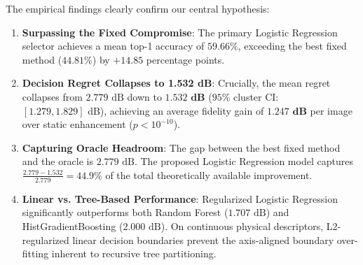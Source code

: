\documentclass[journal]{IEEEtran}
\begin{document}
\begin{table}[!t]
\centering
\caption{Primary Benchmark Results (5-Fold Grouped CV across 3 Random Seeds)}
\label{tab:primary_results}
\end{table}

The empirical findings clearly confirm our central hypothesis:
\begin{enumerate}
    \item \textbf{Surpassing the Fixed Compromise}: The primary Logistic Regression selector achieves a mean top-1 accuracy of $\mathbf{59.66\%}$, exceeding the best fixed method ($44.81\%$) by $\mathbf{+14.85}$ percentage points.
    \item \textbf{Decision Regret Collapses to 1.532 dB}: Crucially, the mean regret collapses from $2.779\text{ dB}$ down to $\mathbf{1.532\text{ dB}}$ ($95\%$ cluster CI: $[1.279, 1.829]\text{ dB}$), achieving an average fidelity gain of $\mathbf{1.247\text{ dB}}$ per image over static enhancement ($p < 10^{-10}$).
    \item \textbf{Capturing Oracle Headroom}: The gap between the best fixed method and the oracle is $2.779\text{ dB}$. The proposed Logistic Regression model captures $\frac{2.779 - 1.532}{2.779} = \mathbf{44.9\%}$ of the total theoretically available improvement.
    \item \textbf{Linear vs. Tree-Based Performance}: Regularized Logistic Regression significantly outperforms both Random Forest ($1.707\text{ dB}$) and HistGradientBoosting ($2.000\text{ dB}$). On continuous physical descriptors, L2-regularized linear decision boundaries prevent the axis-aligned boundary over-fitting inherent to recursive tree partitioning.
\end{enumerate}
\end{document}

